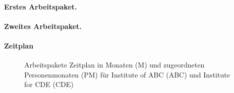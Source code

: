 \documentclass[ngerman]{scrartcl}
\begin{document}
\addtocounter{secnumdepth}{1}
\renewcommand{\theparagraph}{AP\arabic{paragraph}}

\hrulefill
\paragraph{Erstes Arbeitspaket.}
\label{wp:1}



\hrulefill
\paragraph{Zweites Arbeitspaket.}
\label{wp:2}





\let\theparagraph=\oldpara
\paragraph*{Zeitplan}
\vspace{-0.5cm}
\begin{figure}[h]
	\centering
  	\resizebox{\textwidth}{!}{}
	\caption{Arbeitspakete Zeitplan in Monaten (M) und zugeordneten Personenmonaten (PM) f\"ur Institute of ABC (ABC) und Institute for CDE (CDE)}
	\label{fig:timeline}
\end{figure}
\end{document}
